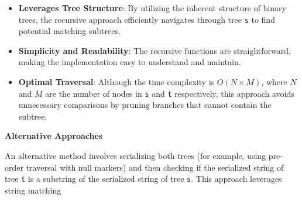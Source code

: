 \begin{itemize}
    \item \textbf{Leverages Tree Structure}: By utilizing the inherent structure of binary trees, the recursive approach efficiently navigates through tree \texttt{s} to find potential matching subtrees.
    \item \textbf{Simplicity and Readability}: The recursive functions are straightforward, making the implementation easy to understand and maintain.
    \item \textbf{Optimal Traversal}: Although the time complexity is \(O(N \times M)\), where \(N\) and \(M\) are the number of nodes in \texttt{s} and \texttt{t} respectively, this approach avoids unnecessary comparisons by pruning branches that cannot contain the subtree.
\end{itemize}

\textbf{Alternative Approaches}

An alternative method involves serializing both trees (for example, using pre-order traversal with null markers) and then checking if the serialized string of tree \texttt{t} is a substring of the serialized string of tree \texttt{s}. This approach leverages string matching